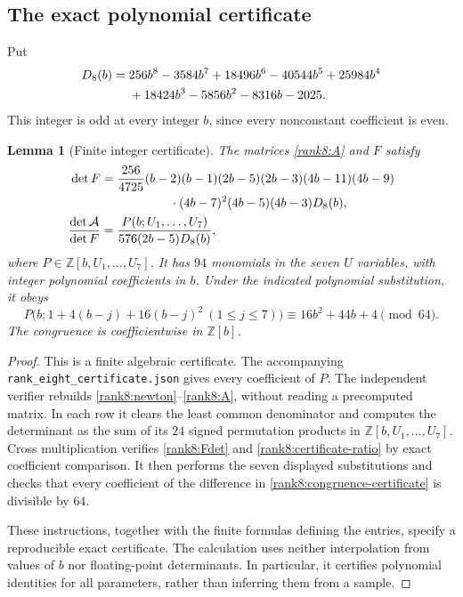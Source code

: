 \documentclass[11pt,letterpaper]{article}
\newtheorem{lemma}[theorem]{Lemma}
\theoremstyle{definition}
\theoremstyle{remark}
\numberwithin{equation}{section}
\begin{document}
\subsection{The exact polynomial certificate}

Put
\begin{align}
 D_8(b)={}&256b^8-3584b^7+18496b^6-40544b^5
 +25984b^4\notag\\
 &+18424b^3-5856b^2-8316b-2025.
 \label{rank8:D8}
\end{align}
This integer is odd at every integer $b$, since every nonconstant
coefficient is even.

\begin{lemma}[Finite integer certificate]\label{rank8:certificate}
The matrices \eqref{rank8:A} and $F$ satisfy
\begin{align}
 \det F={}&\frac{256}{4725}(b-2)(b-1)(2b-5)(2b-3)
 (4b-11)(4b-9)\notag\\
 &\hspace{15mm}\cdot(4b-7)^2(4b-5)(4b-3)D_8(b),
 \label{rank8:Fdet}\\
 \frac{\det\mathcal A}{\det F}
   ={}&\frac{P(b;U_1,\ldots,U_7)}{576(2b-5)D_8(b)},
 \label{rank8:certificate-ratio}
\end{align}
where $P\in\mathbb Z[b,U_1,\ldots,U_7]$.  It has $94$ monomials
in the seven $U$ variables, with integer polynomial coefficients in
$b$.  Under the indicated polynomial substitution, it obeys
\begin{equation}\label{rank8:congruence-certificate}
 \boxed{P\bigl(b;1+4(b-j)+16(b-j)^2\ (1\le j\le7)\bigr)
       \equiv16b^2+44b+4\pmod {64}.}
\end{equation}
The congruence is coefficientwise in $\mathbb Z[b]$.
\end{lemma}

\begin{proof}
This is a finite algebraic certificate. The accompanying
\texttt{rank\_eight\_certificate.json} gives
every coefficient of $P$.  The independent verifier rebuilds
\eqref{rank8:newton}--\eqref{rank8:A}, without reading a precomputed
matrix.  In each row it clears the least common denominator and
computes the determinant as the sum of its $24$ signed permutation
products in $\mathbb Z[b,U_1,\ldots,U_7]$.  Cross multiplication
verifies \eqref{rank8:Fdet} and \eqref{rank8:certificate-ratio} by
exact coefficient comparison.  It then performs the seven displayed
substitutions and checks that every coefficient of the difference in
\eqref{rank8:congruence-certificate} is divisible by $64$.

These instructions, together with the finite formulas defining the
entries, specify a reproducible exact certificate.  The calculation
uses neither interpolation from values of $b$ nor floating-point
determinants.  In particular, it certifies polynomial identities for
all parameters, rather than inferring them from a sample.
\end{proof}
\end{document}
